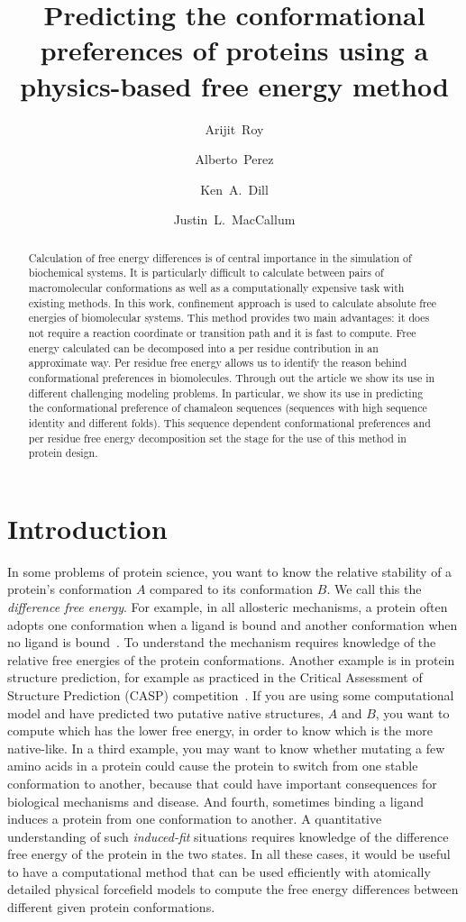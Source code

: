 \documentclass[12pt]{article}
\author{Arijit~Roy}
\author{Alberto~Perez}
\author{Ken~A.~Dill}
\author{Justin~L.~MacCallum}
\affil{Laufer Center for Physical and Quantitative Biology\\
    and Departments of Physics and Chemistry\\
    Stony Brook University\\
    Stony Brook, NY 11794-5252.}
\title{Predicting the conformational preferences of proteins using a physics-based free energy
method}
\begin{document}
\maketitle

\begin{abstract}

Calculation of free energy differences is of central importance in the simulation of biochemical
systems. It is particularly difficult to calculate between pairs of macromolecular conformations as
well as a computationally expensive task with existing methods. In this work, confinement approach
is used to calculate absolute free energies of biomolecular systems. This method provides two main
advantages: it does not require a reaction coordinate or transition path and it is fast to compute.
Free energy calculated can be decomposed into a per residue contribution in an approximate way. Per
residue free energy allows us to identify the reason behind conformational preferences in
biomolecules. Through out the article we show its use in different challenging modeling problems. In
particular, we show its use in predicting the conformational preference of chamaleon sequences
(sequences with high sequence identity and different folds). This sequence dependent conformational
preferences and per residue free energy decomposition set the stage for the use of this method in
protein design.

\end{abstract}

\section*{Introduction}

In some problems of protein science, you want to know the relative stability of a protein's conformation $A$ compared to
its conformation $B$.  We call this the \emph{difference free energy}. For example, in all allosteric mechanisms, a protein
often adopts one conformation when a ligand is bound and another conformation when no ligand is bound~\cite{Elber2007}.
To understand the mechanism requires knowledge of the relative free energies of the protein conformations.  Another
example is in protein structure prediction, for example as practiced in the Critical Assessment of Structure Prediction
(CASP) competition~\cite{Moult2011}. If you are using some computational model and have predicted two putative native
structures, $A$ and $B$, you want to compute which has the lower free energy, in order to know which is the more
native-like.  In a third example, you may want to know whether mutating a few amino acids in a protein could cause the
protein to switch from one stable conformation to another, because that could have important consequences for biological
mechanisms and disease. And fourth, sometimes binding a ligand induces a protein from one conformation to another. A
quantitative understanding of such \emph{induced-fit} situations requires knowledge of the difference free energy of the
protein in the two states. In all these cases, it would be useful to have a computational method that can be used
efficiently with atomically detailed physical forcefield models to compute the free energy differences between different
given protein conformations.
\end{document}
